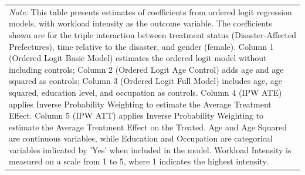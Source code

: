 \documentclass[a4paper,12pt]{article}
\begin{document}
\begin{table}[htbp]
{\begin{tabular}{@{\extracolsep{5pt}}lccccc}
\multicolumn{6}{p{1.90\linewidth}}{\footnotesize \textit{Note:} This table presents estimates of coefficients from ordered logit regression models, with workload intensity as the outcome variable. The coefficients shown are for the triple interaction between treatment status (Disaster-Affected Prefectures), time relative to the disaster, and gender (female). Column 1 (Ordered Logit Basic Model) estimates the ordered logit model without including controls; Column 2 (Ordered Logit Age Control) adds age and age squared as controls; Column 3 (Ordered Logit Full Model) includes age, age squared, education level, and occupation as controls. Column 4 (IPW ATE) applies Inverse Probability Weighting to estimate the Average Treatment Effect. Column 5 (IPW ATT) applies Inverse Probability Weighting to estimate the Average Treatment Effect on the Treated. Age and Age Squared are continuous variables, while Education and Occupation are categorical variables indicated by 'Yes' when included in the model. Workload Intensity is measured on a scale from 1 to 5, where 1 indicates the highest intensity.}\\
\end{tabular}
}

\label{table:workload_intensity}

\end{table}


\end{document}
